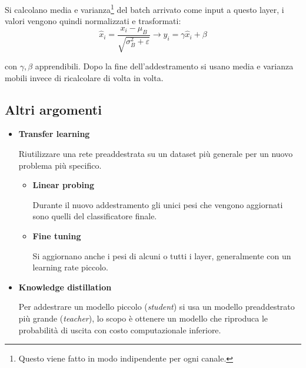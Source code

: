 \documentclass{article}
\begin{document}
\begin{itemize}
\begin{itemize}
            Si calcolano media e varianza\footnote{Questo viene fatto in modo indipendente per ogni canale.} del batch arrivato come input a questo layer, i valori vengono quindi normalizzati e trasformati:
            \[
            \hat{x}_i=\frac{x_i-\mu_B}{\sqrt{\sigma_B^2+\varepsilon}}\rightarrow
            y_i=\gamma\hat{x}_i+\beta
            \]

            \vspace{5pt}

            con $\gamma,\beta$ apprendibili. Dopo la fine dell'addestramento si usano media e varianza mobili invece di ricalcolare di volta in volta.
        
        \end{itemize}

\end{itemize}

\newpage

\subsection{Altri argomenti}

\begin{itemize}
    \item \textbf{Transfer learning}  
    
    Riutilizzare una rete preaddestrata su un dataset più generale per un nuovo problema più specifico. 

    \begin{itemize}
        \item \textbf{Linear probing} 
        
        Durante il nuovo addestramento gli unici pesi che vengono aggiornati sono quelli del classificatore finale.
        
        \item \textbf{Fine tuning}

        Si aggiornano anche i pesi di alcuni o tutti i layer, generalmente con un learning rate piccolo.
        
    \end{itemize}

    \item \textbf{Knowledge distillation} 
    
    Per addestrare un modello piccolo (\emph{student}) si usa un modello preaddestrato più grande (\emph{teacher}), lo scopo è ottenere un modello che riproduca le probabilità di uscita con costo computazionale inferiore.

\end{itemize}
\end{document}
